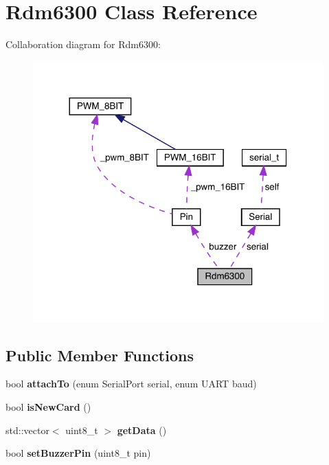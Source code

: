 \hypertarget{classRdm6300}{}\section{Rdm6300 Class Reference}
\label{classRdm6300}


Collaboration diagram for Rdm6300\+:\nopagebreak
\begin{figure}[H]
\begin{center}
\leavevmode
\includegraphics[width=317pt]{classRdm6300__coll__graph}
\end{center}
\end{figure}
\subsection*{Public Member Functions}
\begin{DoxyCompactItemize}
\item 
\mbox{\label{classRdm6300_aff170c6261d9e9364d3592dea5743671}} 
bool {\bfseries attach\+To} (enum Serial\+Port serial, enum U\+A\+RT baud)
\item 
\mbox{\label{classRdm6300_a09b6928f381395bf097db97bab27639d}} 
bool {\bfseries is\+New\+Card} ()
\item 
\mbox{\label{classRdm6300_a26db1ddb2e181b75063681a930ae296a}} 
std\+::vector$<$ uint8\+\_\+t $>$ {\bfseries get\+Data} ()
\item 
\mbox{\label{classRdm6300_ae1b10584606691ff109c5395432e7ef9}} 
bool {\bfseries set\+Buzzer\+Pin} (uint8\+\_\+t pin)
\end{DoxyCompactItemize}
